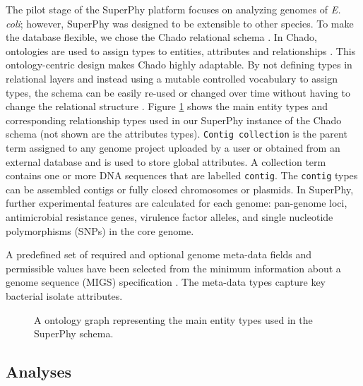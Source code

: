 \documentclass[a4paper,twoside]{article}
\begin{document}
The pilot stage of the SuperPhy platform focuses on analyzing genomes of \textit{E. coli}; however, SuperPhy was designed to be extensible to other species. To make the database flexible, we chose the Chado relational schema \cite{mungall2007chado}. In Chado, ontologies are used to assign types to entities, attributes and relationships \cite{mungall2007chado}. This ontology-centric design makes Chado highly adaptable. By not defining types in relational layers and instead using a mutable controlled vocabulary to assign types, the schema can be easily re-used or changed over time without having to change the relational structure \cite{mungall2007chado}.  Figure \ref{fig:ontology} shows the main entity types and corresponding relationship types used in our SuperPhy instance of the Chado schema (not shown are the attributes types). \texttt{Contig collection} is the parent term assigned to any genome project uploaded by a user or obtained from an external database and is used to store global attributes. A collection term contains one or more DNA sequences that are labelled \texttt{contig}. The \texttt{contig} types can be assembled contigs or fully closed chromosomes or plasmids. In SuperPhy, further experimental features are calculated for each genome: pan-genome loci, antimicrobial resistance genes, virulence factor alleles, and single nucleotide polymorphisms (SNPs) in the core genome.

A predefined set of required and optional genome meta-data fields and permissible values have been selected from the minimum information about a genome sequence (MIGS) specification \cite{field2008}. The meta-data types capture key bacterial isolate attributes.

\begin{figure}[t]
  \centering
   {}
  \vspace{0.2cm}
  \caption{A ontology graph representing the main entity types used in the SuperPhy schema.}
  \label{fig:ontology}
\end{figure}

\subsection{Analyses}
\label{sec:pipeline}
\end{document}
